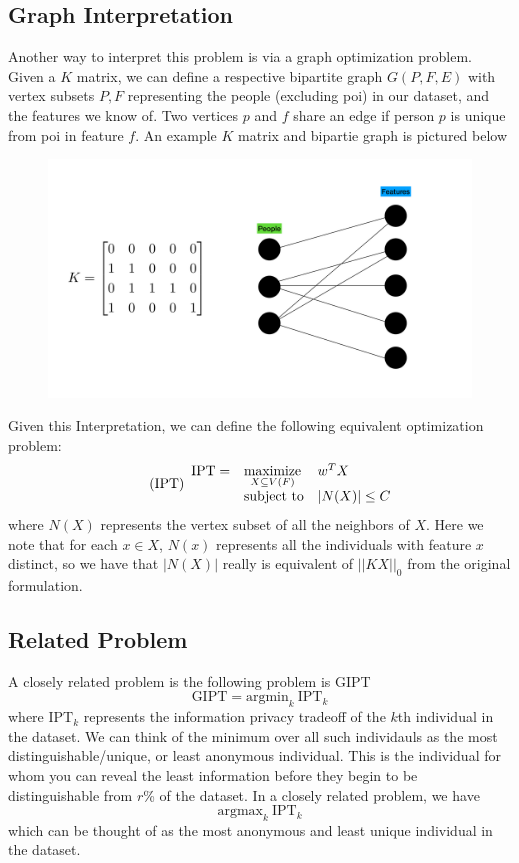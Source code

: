 \documentclass[12pt]{article}
\newcommand{\priv}{\text{IPT}}
\begin{document}
\subsection{Graph Interpretation}
Another way to interpret this problem is via a graph optimization problem. Given a $K$ matrix, we can define a respective bipartite graph $G(P,F,E)$ with vertex subsets $P,F$ representing the people (excluding \gls{poi}) in our dataset, and the features we know of. Two vertices $p$ and $f$ share an edge if person $p$ is unique from \gls{poi} in feature $f$. An example $K$ matrix and bipartie graph is pictured below
\begin{figure}[H]
    \centering
    \includegraphics[width = 14cm]{../images/graph_ipt.pdf}
    \label{fig:graph}
\end{figure}
Given this Interpretation, we can define the following equivalent optimization problem:
\begin{equation}
	\label{eq:priv_graph} 
    \tag{$\priv$} 
	\begin{array}{lll}
		\priv = & \underset{X \sbs V(F)}{\text{maximize}} & w^T X \\
		& \mbox{subject to} & |N(X)| \leq C \\
		\end{array}
\end{equation}
where $N(X)$ represents the vertex subset of all the neighbors of $X$. Here we note that for each $x\in X$, $N(x)$ represents all the individuals with feature $x$ distinct, so we have that $|N(X)|$ really is equivalent of $||K X||_0$ from the original formulation.
\subsection{Related Problem}
A closely related problem is the following problem is \gls{GIPT}
\[\text{GIPT} = \text{argmin}_k \ \priv_k\]
where $\priv_k$ represents the information privacy tradeoff of the $k$th individual in the dataset. We can think of the minimum over all such individauls as the most distinguishable/unique, or least anonymous individual. This is the individual for whom you can reveal the least information before they begin to be distinguishable from $r$\% of the dataset. 
In a closely related problem, we have 
\[\text{argmax}_k \ \priv_k\]
which can be thought of as the most anonymous and least unique individual in the dataset. 
\end{document}
